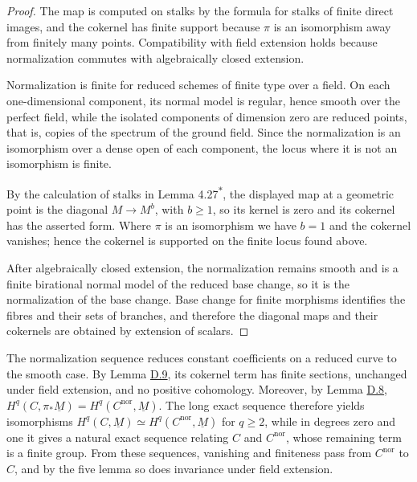 \documentclass[11pt]{article}
\newcommand{\bpout}[1]{#1\textsuperscript{\hyperlink{bp-outside}{\ensuremath{\ast}}}}
\begin{document}
\begin{proof}[{Proof}]\label{bp35}%
The map is computed on stalks by the formula for stalks of finite direct images, and the cokernel has finite support because \(\pi\) is an isomorphism away from finitely many points. Compatibility with field extension holds because normalization commutes with algebraically closed extension.

Normalization is finite for reduced schemes of finite type over a field.  On each one-dimensional component, its normal model is regular, hence smooth over the perfect field, while the isolated components of dimension zero are reduced points, that is, copies of the spectrum of the ground field.  Since the normalization is an isomorphism over a dense open of each component, the locus where it is not an isomorphism is finite.

By the calculation of stalks in Lemma \bpout{4.27}, the displayed map at a geometric point is the diagonal \(M\to M^b\), with \(b\geq1\), so its kernel is zero and its cokernel has the asserted form.  Where \(\pi\) is an isomorphism we have \(b=1\) and the cokernel vanishes; hence the cokernel is supported on the finite locus found above.

After algebraically closed extension, the normalization remains smooth and is a finite birational normal model of the reduced base change, so it is the normalization of the base change.  Base change for finite morphisms identifies the fibres and their sets of branches, and therefore the diagonal maps and their cokernels are obtained by extension of scalars.
\end{proof}

\label{bp36}%
The normalization sequence reduces constant coefficients on a reduced curve to the smooth case. By Lemma \hyperref[bp31]{D.9}, its cokernel term has finite sections, unchanged under field extension, and no positive cohomology. Moreover, by Lemma \hyperref[bp28]{D.8}, \(H^q(C,\pi_*\underline M)=H^q(C^{\mathrm{nor}},\underline M)\). The long exact sequence therefore yields isomorphisms \(H^q(C,\underline M)\simeq H^q(C^{\mathrm{nor}},\underline M)\) for \(q\geq2\), while in degrees zero and one it gives a natural exact sequence relating \(C\) and \(C^{\mathrm{nor}}\), whose remaining term is a finite group. From these sequences, vanishing and finiteness pass from \(C^{\mathrm{nor}}\) to \(C\), and by the five lemma so does invariance under field extension.
\end{document}
